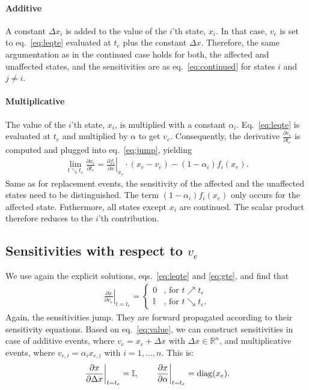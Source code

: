 \documentclass[journal, a4paper]{IEEEtran}
\begin{document}
\paragraph{Additive}
A constant $\Delta x_i$ is added to the value of the $i$'th state, $x_i$. In that case, $v_e$ is set to eq.~\eqref{eq:leqte} evaluated at $t_e$ plus the constant $\Delta x$. Therefore, the same argumentation as in the continued case holds for both, the affected and unaffected states, and the sensitivities are as eq.~\eqref{eq:continued} for states $i$ and $j\neq i$. \\

\paragraph{Multiplicative}
The value of the $i$'th state, $x_i$, is multiplied with a constant $\alpha_i$. Eq.~\eqref{eq:leqte} is evaluated at $t_e$ and multiplied by $\alpha$ to get $v_e$. Consequently, the derivative $\frac{\partial v_e}{\partial t_e}$ is computed and plugged into eq.~\eqref{eq:jump}, yielding
\begin{align}
    \lim_{t\searrow t_e}\frac{\partial x_i}{\partial t_e} = \left.\frac{\partial f_i}{\partial x}\right|_{x_e}\cdot (x_e - v_e) - (1-\alpha_i)f_i(x_e).
\end{align}
Same as for replacement events, the sensitivity of the affected and the unaffected states need to be distinguished. The term $(1-\alpha_i)f_i(x_e)$ only occurs for the affected state. Futhermore, all states except $x_i$ are continued. The scalar product therefore reduces to the $i$'th contribution.


\subsection{Sensitivities with respect to $v_e$}

We use again the explicit solutions, eqs.~\eqref{eq:leqte} and \eqref{eq:gte}, and find that
\begin{align}
    \left.\frac{\partial x}{\partial v_e}\right|_{t = t_e} =
    \left\{
    \begin{array}{ll}
    0     & \textrm{, for } t\nearrow t_e \\
    \mathbb I     & \textrm{, for }t \searrow t_e.
    \end{array}
    \right.
    \label{eq:value}
\end{align}
Again, the sensitivities jump. They are forward propagated according to their sensitivity equations. Based on eq.~\eqref{eq:value}, we can construct sensitivities in case of additive events, where $v_e = x_e + \Delta x$ with $\Delta x \in \mathbb R^n$, and multiplicative events, where $v_{e, i} = \alpha_i x_{e, i}$ with $i = 1, \dots, n$. This is:
\begin{align}
    \left.\frac{\partial x}{\partial \Delta x}\right|_{t = t_e} = \mathbb I, \qquad \left.\frac{\partial x}{\partial \alpha}\right|_{t = t_e} = {\rm diag}(x_e).
\end{align}
\end{document}
